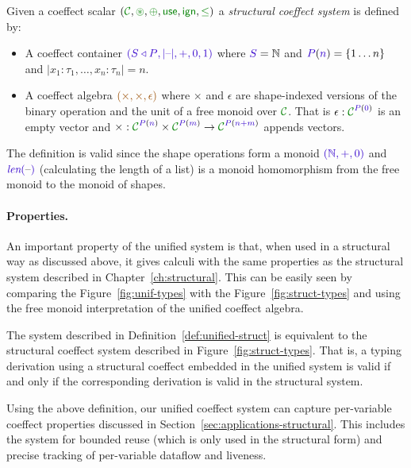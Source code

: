 \begin{definition}
\label{def:unified-struct}
Given a coeffect scalar $(\C, \cseq, \cpar, \cunit, \czero, \cleq)$ a \emph{structural coeffect system} 
is defined by: 

\begin{itemize}
\item A coeffect container $\sclrd{(\SHP, {|}\textnormal{--}{|}, +, 0, 1)}$ where $\SH=\mathbb{N}$ and
  $\SP(\sclrd{n})=\{ 1 \ldots n \}$ and  ${|}x_1\!:\!\tau_1,\ldots,x_n\!:\!\tau_n{|}=n$.

\item A coeffect algebra $\aclrd{(\times, \times, \epsilon)}$ where $\times$ and $\epsilon$ are
  shape-indexed versions of the binary operation and the unit of a free monoid over $\C$.
  That is $\epsilon : \C^{\SP(\sclrd{0})}$ is an empty vector and 
  $\times : \C^{\SP(\sclrd{n})} \times \C^{\SP(\sclrd{m})} \rightarrow \C^{\SP(\sclrd{n + m})}$ 
  appends vectors.
\end{itemize}
\end{definition}

\noindent
The definition is valid since the shape operations form a monoid
$\sclrd{(\mathbb{N}, +, 0)}$ and $\slen{\textnormal{--}}$ (calculating the length of
a list) is a monoid homomorphism from the free monoid to the monoid of
shapes.

\paragraph{Properties.}
An important property of the unified system is that, when used in a structural way as discussed
above, it gives calculi with the same properties as the structural system described in 
Chapter~\ref{ch:structural}. This can be easily seen by comparing the Figure~\ref{fig:unif-types}
with the Figure~\ref{fig:struct-types} and using the free monoid interpretation of the unified
coeffect algebra.

\begin{remark}
The system described in Definition~\ref{def:unified-struct} is equivalent to the structural coeffect
system described in Figure~\ref{fig:struct-types}. That is, a typing derivation using a structural
coeffect embedded in the unified system is valid if and only if the corresponding derivation is
valid in the structural system.
\end{remark}

\noindent
Using the above definition, our unified coeffect system can capture per-variable coeffect properties
discussed in Section~\ref{sec:applications-structural}. This includes the system for bounded reuse 
(which is only used in the structural form) and precise tracking of per-variable dataflow and liveness. 

